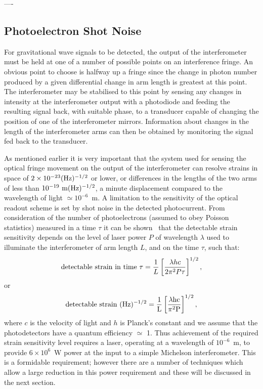 \documentclass{article}
\begin{document}




----

\subsection{Photoelectron Shot Noise}
\label{subsection:shotnoise}

For gravitational wave signals to be detected, the output of the
interferometer must be held at one of a number of possible points on
an interference fringe. An obvious point to choose is halfway up a
fringe since the change in photon number produced by a given
differential change in arm length is greatest at this point.  The
interferometer may be stabilised to this point by sensing any changes
in intensity at the interferometer output with a photodiode and
feeding the resulting signal back, with suitable phase, to a
transducer capable of changing the position of one of the
interferometer mirrors.  Information about changes in the length of
the interferometer arms can then be obtained by monitoring the signal
fed back to the transducer.

As mentioned earlier it is very important that the system used for
sensing the optical fringe movement on the output of the
interferometer can resolve strains in space of $2 \times
10^{-23}(\rm Hz)^{-1/2}$ or lower, or differences in the lengths of the
two arms of less than $10^{-19}{\rm \ m(\rm Hz)^{-1/2}}$, a minute
displacement compared to the wavelength of light $\simeq 10^{-6}$~m. A
limitation to the sensitivity of the optical readout scheme is set by
shot noise in the detected photocurrent. From consideration of the
number of photoelectrons (assumed to obey Poisson statistics) measured
in a time $\tau$ it can be shown~\cite{HoughMG5} that the detectable
strain sensitivity depends on the level of laser power $P$ of
wavelength $\lambda$ used to illuminate the interferometer of arm
length $L$, and on the time $\tau$, such that:
%
\begin{equation}
  {\rm detectable\ strain\ in\ time\ } \tau = \frac 1{L}\left[\frac{\lambda h
  c}{2 \pi^{2} P \tau}\right]^{1/2},
  \label{equation:shot1}
\end{equation}
%
or
%
\begin{equation}
  {\rm detectable\ strain\ }(\rm Hz)^{-1/2} = \frac
  1{L}\left[\frac{\lambda h c}{\pi^{2} P }\right]^{1/2},
  \label{equation:shot2}
\end{equation}
%
where $c$ is the velocity of light and $h$ is Planck's constant and we
assume that the photodetectors have a quantum efficiency $\simeq$
1. Thus achievement of the required strain sensitivity level requires
a laser, operating at a wavelength of $10^{-6}$~m, to provide $6
\times 10^{6}$~W power at the input to a simple Michelson
interferometer. This is a formidable requirement; however there are a
number of techniques which allow a large reduction in this power
requirement and these will be discussed in the next section.
\end{document}
